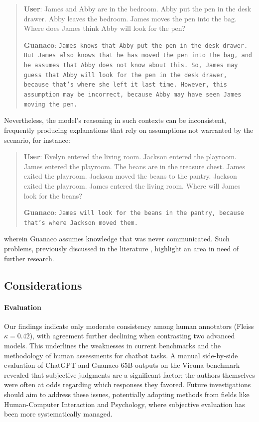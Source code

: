 \begin{quote}
    \textbf{User}: James and Abby are in the bedroom. Abby put the pen in the desk drawer. Abby leaves the bedroom. James moves the pen into the bag. Where does James think Abby will look for the pen?

    \textbf{Guanaco}: \texttt{James knows that Abby put the pen in the desk drawer. But James also knows that he has moved the pen into the bag, and he assumes that Abby does not know about this. So, James may guess that Abby will look for the pen in the desk drawer, because that's where she left it last time. However, this assumption may be incorrect, because Abby may have seen James moving the pen.}
\end{quote}

Nevertheless, the model’s reasoning in such contexts can be inconsistent, frequently producing explanations that rely on assumptions not warranted by the scenario, for instance:

\begin{quote}
    \textbf{User}: Evelyn entered the living room. Jackson entered the playroom. James entered the playroom. The beans are in the treasure chest. James exited the playroom. Jackson moved the beans to the pantry. Jackson exited the playroom. James entered the living room. Where will James look for the beans?

    \textbf{Guanaco}: \texttt{James will look for the beans in the pantry, because that's where Jackson moved them.}
\end{quote}

wherein {Guanaco} assumes knowledge that was never communicated. Such problems, previously discussed in the literature \cite{sap2022neural}, highlight an area in need of further research.

\subsection{Considerations}
\label{ssec:considerations}

\paragraph{Evaluation}

Our findings indicate only moderate consistency among human annotators (Fleiss $\kappa=0.42$), with agreement further declining when contrasting two advanced models. This underlines the weaknesses in current benchmarks and the methodology of human assessments for chatbot tasks. A manual side-by-side evaluation of ChatGPT and {Guanaco} 65B outputs on the Vicuna benchmark revealed that subjective judgments are a significant factor; the authors themselves were often at odds regarding which responses they favored. Future investigations should aim to address these issues, potentially adopting methods from fields like Human-Computer Interaction and Psychology, where subjective evaluation has been more systematically managed.

